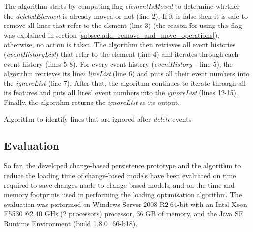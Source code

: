 \documentclass[12pt, a4paper]{report} \usepackage[titletoc]{appendix}
\begin{document}
The algorithm starts by computing flag \emph{elementIsMoved} to determine whether the \emph{deletedElement} is already moved or not (line 2).
If it is false then it is safe to remove all lines that refer to the element (line 3) (the reason for using this flag was explained in section \ref{subsec:add_remove_and_move_operations}), otherwise, no action is taken. The algorithm then retrieves all event histories (\emph{eventHistoryList}) that refer to the element (line 4) and iterates through each event history (lines 5-8). For every event history (\emph{eventHistory} -- line 5), the algorithm retrieves its lines \emph{lineList} (line 6) and puts all their event numbers into the \emph{ignoreList} (line 7). After that, the algorithm continues to iterate through all its features and puts all lines' event numbers into the \emph{ignoreList} (lines 12-15). Finally, the algorithm returns the \emph{ignoreList} as its output.

\begin{algorithm}[H]
    \begin{small}
    \end{small}
    \caption{Algorithm to identify lines that are ignored after \emph{delete} events}
    \label{alg:create_delete_optimisation}
\end{algorithm}


\subsection{Evaluation}
\label{subsec:evaluation}
So far, the developed change-based persistence prototype and the algorithm to reduce the loading time of change-based models have been evaluated on time required to save changes made to change-based models, and on the time and memory footprints used in performing the loading optimisation algorithm. The evaluation was performed on Windows Server 2008 R2 64-bit with an Intel Xeon E5530 @2.40 GHz (2 processors) processor, 36 GB of memory, and the Java SE Runtime Environment (build 1.8.0\_66-b18).
\end{document}
